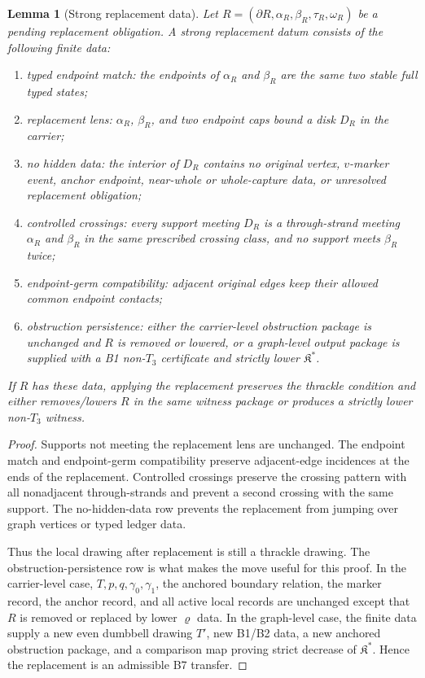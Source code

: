\documentclass[11pt]{amsart}
\newtheorem{lemma}[theorem]{Lemma}
\theoremstyle{definition}
\begin{document}
\begin{lemma}[Strong replacement data]
Let \(R=(\partial R,\alpha_R,\beta_R,\tau_R,\omega_R)\) be a pending replacement obligation. A strong replacement datum consists of the following finite data:

\begin{enumerate}
\item typed endpoint match: the endpoints of \(\alpha_R\) and \(\beta_R\) are the same two stable full typed states;
\item replacement lens: \(\alpha_R\), \(\beta_R\), and two endpoint caps bound a disk \(D_R\) in the carrier;
\item no hidden data: the interior of \(D_R\) contains no original vertex, \(v\)-marker event, anchor endpoint, near-whole or whole-capture data, or unresolved replacement obligation;
\item controlled crossings: every support meeting \(D_R\) is a through-strand meeting \(\alpha_R\) and \(\beta_R\) in the same prescribed crossing class, and no support meets \(\beta_R\) twice;
\item endpoint-germ compatibility: adjacent original edges keep their allowed common endpoint contacts;
\item obstruction persistence: either the carrier-level obstruction package is unchanged and \(R\) is removed or lowered, or a graph-level output package is supplied with a B1 non-\(T_3\) certificate and strictly lower \(\mathfrak K^\ast\).
\end{enumerate}

If \(R\) has these data, applying the replacement preserves the thrackle condition
and either removes/lowers \(R\) in the same witness package or produces a
strictly lower non-\(T_3\) witness.

\end{lemma}
\begin{proof}
Supports not meeting the replacement lens are unchanged. The endpoint match and endpoint-germ compatibility preserve adjacent-edge incidences at the ends of the replacement. Controlled crossings preserve the crossing pattern with all nonadjacent through-strands and prevent a second crossing with the same support. The no-hidden-data row prevents the replacement from jumping over graph vertices or typed ledger data.

Thus the local drawing after replacement is still a thrackle drawing. The
obstruction-persistence row is what makes the move useful for this proof. In
the carrier-level case, \(T,p,q,\gamma_0,\gamma_1\), the anchored boundary
relation, the marker record, the anchor record, and all active local records
are unchanged except that \(R\) is removed or replaced by lower \(\varrho\) data. In
the graph-level case, the finite data supply a new even dumbbell drawing \(T'\),
new B1/B2 data, a new anchored obstruction package, and a comparison map
proving strict decrease of \(\mathfrak K^\ast\). Hence the replacement is an
admissible B7 transfer.

\end{proof}
\end{document}
